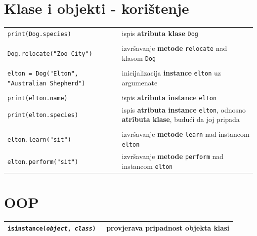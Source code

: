 \documentclass[10pt]{article}
\begin{document}
    \section*{\color{NavyBlue} Klase i objekti - korištenje}
    \begin{tabular}{|>{\tt}p{10.00cm}|>{}p{14.50cm}|}
        \hline
        print(Dog.species) & ispis \textbf{atributa klase} \texttt{Dog}
        \\ & \\
        Dog.relocate("Zoo City") & izvršavanje \textbf{metode} \texttt{relocate} nad klasom \texttt{Dog}
        \\ & \\
        elton = Dog("Elton", "Australian Shepherd") & inicijalizacija \textbf{instance} \texttt{elton} uz argumenate
        \\ & \\
        print(elton.name) & ispis \textbf{atributa instance} \texttt{elton}
        \\
        print(elton.species) & ispis \textbf{atributa instance} \texttt{elton}, odnosno \textbf{atributa klase}, budući da joj pripada
        \\ & \\
        elton.learn("sit") & izvršavanje \textbf{metode} \texttt{learn} nad instancom \texttt{elton}
        \\
        elton.perform("sit") & izvršavanje \textbf{metode} \texttt{perform} nad instancom \texttt{elton}
        \\ \hline
    \end{tabular}

    \section*{\color{NavyBlue} OOP}
    \begin{tabular}{|>{\tt}p{8.00cm}|>{}p{16.50cm}|}
        \hline
        isinstance(\textit{object}, \textit{class}) & provjerava pripadnost \textbf{objekta} \textbf{klasi}
        \\ \hline
    \end{tabular}
\end{document}
